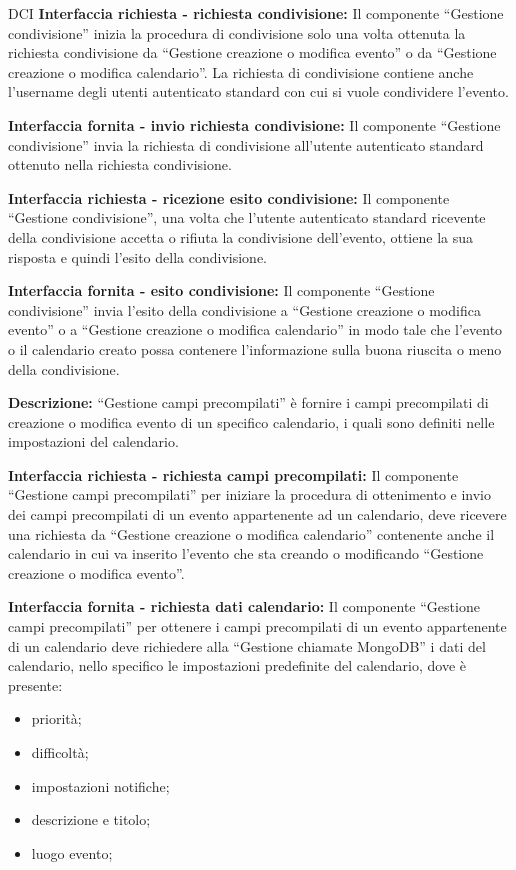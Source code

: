 \begin{listaPersonale}{DCI}
    \textbf{Interfaccia richiesta - richiesta condivisione:} Il componente “Gestione condivisione” inizia la procedura di condivisione solo una volta ottenuta la richiesta condivisione da “Gestione creazione o modifica evento” o da “Gestione creazione o modifica calendario”. La richiesta di condivisione contiene anche l'username degli utenti autenticato standard con cui si vuole condividere l'evento.

    \textbf{Interfaccia fornita - invio richiesta condivisione:} Il componente “Gestione condivisione” invia la richiesta di condivisione all'utente autenticato standard ottenuto nella richiesta condivisione.

    \textbf{Interfaccia richiesta - ricezione esito condivisione:} Il componente “Gestione condivisione”, una volta che l'utente autenticato standard ricevente della condivisione accetta o rifiuta la condivisione dell'evento, ottiene la sua risposta e quindi l'esito della condivisione.

    \textbf{Interfaccia fornita - esito condivisione:} Il componente “Gestione condivisione” invia l'esito della condivisione a “Gestione creazione o modifica evento” o a “Gestione creazione o modifica calendario” in modo tale che l'evento o il calendario creato possa contenere l'informazione sulla buona riuscita o meno della condivisione.



    \textbf{Descrizione:}  “Gestione campi precompilati” è fornire i campi precompilati di creazione o modifica evento di un specifico calendario, i quali sono definiti nelle impostazioni del calendario.

    \textbf{Interfaccia richiesta - richiesta campi precompilati:} Il componente “Gestione campi precompilati” per iniziare la procedura di ottenimento e invio dei campi precompilati di un evento appartenente ad un calendario, deve ricevere una richiesta da “Gestione creazione o modifica calendario” contenente anche il calendario in cui va inserito l'evento che sta creando o modificando “Gestione creazione o modifica evento”.

    \textbf{Interfaccia fornita - richiesta dati calendario:} Il componente “Gestione campi precompilati” per ottenere i campi precompilati di un evento appartenente di un calendario deve richiedere alla “Gestione chiamate MongoDB” i dati del calendario, nello specifico le impostazioni predefinite del calendario, dove è presente:
    \begin{itemize}
        \item priorità;
        \item difficoltà;
        \item impostazioni notifiche;
        \item descrizione e titolo;
        \item luogo evento;
    \end{itemize}


\end{listaPersonale}

